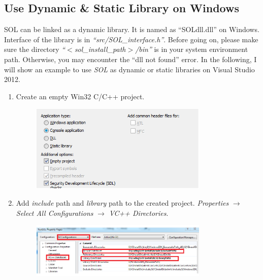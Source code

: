 \documentclass[11pt,a4paper]{article}
\newlength{\wideitemsep}
\let\olditem\item
\renewcommand{\item}{\setlength{\itemsep}{\wideitemsep}\olditem}
\begin{document}
\subsection{Use Dynamic \& Static Library on Windows}
SOL can be linked as a dynamic library. It is named as ``SOLdll.dll'' on
Windows.  Interface of the library is in \emph{``src/SOL\_interface.h''}.
Before going on, please make sure the directory \emph{``$<$sol\_install\_path$>$/bin''} is in your system
environment path. Otherwise, you may encounter the ``dll not found'' error.
In the following, I will show an example to use \emph{SOL} as dynamic or static
libraries on Visual Studio 2012.

\begin{enumerate}
    \item Create an empty Win32 C/C++ project.
        \begin{figure}[!h]
            \centering
            \includegraphics[width=0.8\textwidth]{figs/test_sol_new.png}
            \label{fig:test_sol_new}
        \end{figure}

    \item Add \emph{include} path and \emph{library} path to the created
        project. \emph{Properties} $\rightarrow$ \emph{Select All
        Configurations} $\rightarrow$ \emph{VC++ Directories}. 
        \begin{figure}[!h]
            \centering
            \includegraphics[width=0.8\textwidth]{figs/test_sol_config.png}
            \label{fig:test_sol_config}
        \end{figure}


\end{enumerate}
\end{document}
